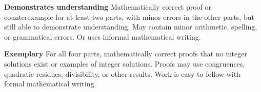 \documentclass[letterpaper, 11pt]{ximera}
\begin{document}
\begin{ex}
\begin{writeRubric}
    \item \textbf{Demonstrates understanding}
    Mathematically correct proof or counterexample for at least two parts, with minor errors in the other parts, but still able to demonstrate understanding. May contain minor arithmetic, spelling, or grammatical errors. Or uses informal mathematical writing.
    
    \item \textbf{Exemplary}
    For all four parts, mathematically correct proofs that no integer solutions exist or examples of integer solutions. Proofs may use congruences, quadratic residues, divisibility, or other results. Work is easy to follow with formal mathematical writing.
        
\end{writeRubric}
\end{ex}
\end{document}
